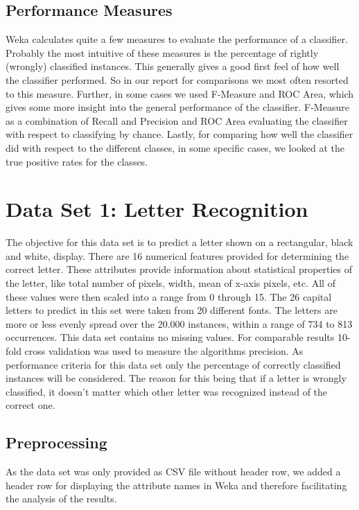 \documentclass{article}
\begin{document}
\subsection{Performance Measures}
Weka calculates quite a few measures to evaluate the performance of a classifier. Probably the most intuitive of these measures is the percentage of rightly (wrongly) classified instances. This generally gives a good first feel of how well the classifier performed. So in our report for comparisons we most often resorted to this measure. Further, in some cases we used F-Measure and ROC Area, which gives some more insight into the general performance of the classifier. F-Measure as a combination of Recall and Precision and ROC Area evaluating the classifier with respect to classifying by chance. Lastly, for comparing how well the classifier did with respect to the different classes, in some specific cases, we looked at the true positive rates for the classes.


\section{Data Set 1: Letter Recognition}
The objective for this data set is to predict a letter shown on a rectangular, black and white, display. There are 16 numerical features  provided for determining the correct letter. These attributes provide information about statistical properties of the letter, like total number of pixels, width, mean of x-axis pixels, etc.
All of these values were then scaled into a range from 0 through 15. The 26 capital letters to predict in this set were taken from 20 different fonts. The letters are more or less evenly spread over the 20.000 instances, within a range of 734 to 813 occurrences. This data set contains no missing values. For comparable results 10-fold cross validation was used to measure the algorithms precision.
As performance criteria for this data set only the percentage of correctly classified instances will be considered. The reason for this being that if a letter is wrongly classified, it doesn't matter which other letter was recognized instead of the correct one. 
\\
\subsection{Preprocessing}
As the data set was only provided as CSV file without header row, we added a header row for displaying the attribute names in Weka and therefore facilitating the analysis of the results. 
\\
\end{document}
